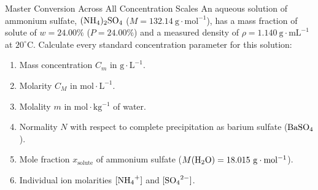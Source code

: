 \begin{exercise}{Master Conversion Across All Concentration Scales}
An aqueous solution of ammonium sulfate, $(\ce{NH4})_2\ce{SO4}$ ($M = 132.14\ \mathrm{g\cdot mol^{-1}}$), has a mass fraction of solute of $w = 24.00\%$ ($P = 24.00\%$) and a measured density of $\rho = 1.140\ \mathrm{g\cdot mL^{-1}}$ at $20^\circ\mathrm{C}$.
Calculate every standard concentration parameter for this solution:
\begin{enumerate}[leftmargin=1.5em,itemsep=2pt]
  \item Mass concentration $C_m$ in $\mathrm{g\cdot L^{-1}}$.
  \item Molarity $C_M$ in $\mathrm{mol\cdot L^{-1}}$.
  \item Molality $m$ in $\mathrm{mol\cdot kg^{-1}}$ of water.
  \item Normality $N$ with respect to complete precipitation as barium sulfate ($\ce{BaSO4}$).
  \item Mole fraction $x_{\text{solute}}$ of ammonium sulfate ($M(\ce{H2O}) = 18.015\ \mathrm{g\cdot mol^{-1}}$).
  \item Individual ion molarities $[\ce{NH4+}]$ and $[\ce{SO4^{2-}}]$.
\end{enumerate}
\end{exercise}

\begin{tabletworkspace}[5.0cm]
\end{tabletworkspace}

